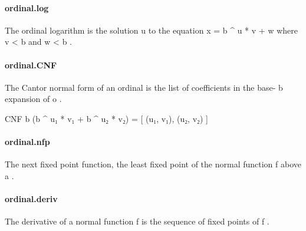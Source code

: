 \documentclass{article}
\begin{document}
\paragraph{ordinal.log}
\par
The ordinal logarithm is the solution 
\colorbox[RGB]{253,246,227}{{{{\color[RGB]{101, 123, 131} u }}}} to the equation
\colorbox[RGB]{253,246,227}{{{{\color[RGB]{101, 123, 131} x  }}}{{{\color[RGB]{181, 137, 0} = }}}{{{\color[RGB]{101, 123, 131}  b \textasciicircum{} u  }}}{{{\color[RGB]{181, 137, 0} * }}}{{{\color[RGB]{101, 123, 131}  v  }}}{{{\color[RGB]{181, 137, 0} + }}}{{{\color[RGB]{101, 123, 131}  w }}}} where 
\colorbox[RGB]{253,246,227}{{{{\color[RGB]{101, 123, 131} v  }}}{{{\color[RGB]{181, 137, 0} < }}}{{{\color[RGB]{101, 123, 131}  b }}}} and 
\colorbox[RGB]{253,246,227}{{{{\color[RGB]{101, 123, 131} w  }}}{{{\color[RGB]{181, 137, 0} < }}}{{{\color[RGB]{101, 123, 131}  b }}}}.
\paragraph{ordinal.CNF}
\par
The Cantor normal form of an ordinal is the list of coefficients
in the base-
\colorbox[RGB]{253,246,227}{{{{\color[RGB]{101, 123, 131} b }}}} expansion of 
\colorbox[RGB]{253,246,227}{{{{\color[RGB]{101, 123, 131} o }}}}.
\par
CNF b (b \textasciicircum{} u₁ * v₁ + b \textasciicircum{} u₂ * v₂) = 
{[}
(u₁, v₁), (u₂, v₂)
{]}
\paragraph{ordinal.nfp}
\par
The next fixed point function, the least fixed point of the
normal function 
\colorbox[RGB]{253,246,227}{{{{\color[RGB]{101, 123, 131} f }}}} above 
\colorbox[RGB]{253,246,227}{{{{\color[RGB]{101, 123, 131} a }}}}.
\paragraph{ordinal.deriv}
\par
The derivative of a normal function 
\colorbox[RGB]{253,246,227}{{{{\color[RGB]{101, 123, 131} f }}}} is
the sequence of fixed points of 
\colorbox[RGB]{253,246,227}{{{{\color[RGB]{101, 123, 131} f }}}}.
\end{document}
